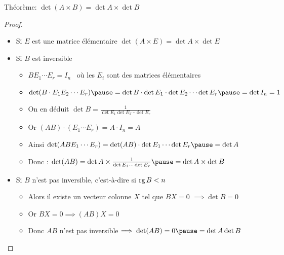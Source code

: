 \begin{frame}
\centerline{Théorème: $\det (A \times B)=\det A  \times \det B$}
\vspace*{-1ex}
\begin{proof}
\pause
\begin{itemize}
 \item Si  $E$ est une matrice élémentaire $\det (A \times E) = \det A \times \det E$
 
 \pause 

 \item Si $B$ est inversible 
 \begin{itemize}
  \item\pause $B E_1\cdots E_r = I_{n}$ \  où les $E_i$ sont des matrices élémentaires  \vspace{.2cm}

    \item\pause $\det (B  \cdot E_1 E_2 \cdots E_r)
\pause=\det B  \cdot \det E_1  \cdot \det E_2 \cdots \det E_r \pause= \det I_n = 1$\vspace{.2cm}
 \item\pause On en déduit 
$
\det B=\frac1{\det E_1 \det E_2 \cdots \det E_r}
$\vspace{.2cm}
 \item\pause Or 
$
(AB) \cdot (E_1\cdots E_r) = A \cdot I_n =A 
$\vspace{.2cm}
 \item\pause Ainsi 
$
\det(A B E_1 \cdots E_r) = \det(A B) \cdot \det E_1  \cdots \det E_r \pause= \det A
$\vspace{.2cm}
 \item\pause Donc :
$\det(AB) = \det A \times \frac1{\det E_1 \cdots \det E_r} \pause= \det A \times \det B$\vspace{.2cm}
\end{itemize}
\item \pause Si $B$ n'est pas inversible, c'est-à-dire si $\mathop{\text{rg}}\nolimits B<n$
\begin{itemize}
  \item\pause Alors il existe un vecteur colonne $X$ tel que $BX=0$ 
\pause $\implies \det B=0$ 
  \item\pause  Or $BX=0 \implies (AB)X=0$ 
  \item\pause Donc $AB$ n'est pas inversible\pause $\implies \det (AB)=0\pause =\det A\det B$\qedhere
\end{itemize}
\end{itemize} 
\end{proof}
\end{frame}

